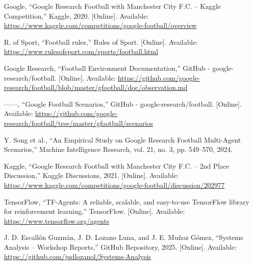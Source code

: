 \documentclass[conference]{IEEEtran}
\begin{document}
\vspace{-0.5em}
\begin{thebibliography}{1}

 Google, “Google Research Football with Manchester City F.C. – Kaggle Competition,” Kaggle, 2020. [Online]. Available: \url{https://www.kaggle.com/competitions/google-football/overview}

 R. of Sport, “Football rules,” Rules of Sport. [Online]. Available: \url{https://www.rulesofsport.com/sports/football.html}

 Google Research, “Football Environment Documentation,” GitHub - google-research/football. [Online]. Available: \url{https://github.com/google-research/football/blob/master/gfootball/doc/observation.md}

 ——, “Google Football Scenarios,” GitHub - google-research/football. [Online]. Available: \url{https://github.com/google-research/football/tree/master/gfootball/scenarios}

 Y. Song et al., “An Empirical Study on Google Research Football Multi-Agent Scenarios,” Machine Intelligence Research, vol. 21, no. 3, pp. 549–570, 2024.

 Kaggle, “Google Research Football with Manchester City F.C. – 2nd Place Discussion,” Kaggle Discussions, 2021. [Online]. Available: \url{https://www.kaggle.com/competitions/google-football/discussion/202977}

 TensorFlow, “TF-Agents: A reliable, scalable, and easy-to-use TensorFlow library for reinforcement learning,” TensorFlow. [Online]. Available: \url{https://www.tensorflow.org/agents}

 J. D. Escallón Guzmán, J. D. Lozano Luna, and J. E. Muñoz Gómez, “Systems Analysis – Workshop Reports,” GitHub Repository, 2025. [Online]. Available: \url{https://github.com/judlozanol/Systems-Analysis}

\end{thebibliography}
\end{document}

